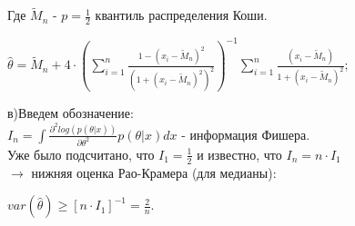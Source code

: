 \documentclass{article}
\begin{document}
Где $\tilde{M}_n$ - $p = \frac{1}{2}$ квантиль распределения Коши.
\begin{center}
$\hat{\theta} = \tilde{M}_n + 4\cdot(\sum\limits_{i=1}^{n} \frac{1-(x_i - \tilde{M}_n)^2}{(1 + (x_i - \tilde{M}_n)^2)^2})^{-1} \sum\limits_{i=1}^{n}\frac{(x_i - \tilde{M}_n)}{1 + (x_i - \tilde{M}_n)^2};$
\end{center}
в)Введем обозначение:\\
$I_{n} = \int \frac{\partial^2 log(p(\theta|x))}{\partial \theta^2} p(\theta|x)dx$ - информация Фишера.\\
Уже было подсчитано, что $I_1 = \frac{1}{2}$ и известно, что $I_n = n\cdot I_1$\\
$\to$ нижняя оценка Рао-Крамера (для медианы):
\begin{center}
$var(\hat{\theta}) \geq [n\cdot I_1]^{-1} = \frac{2}{n}$.
\end{center}
\end{document}

